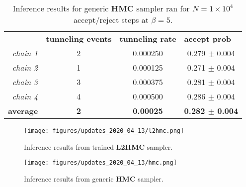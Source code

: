 %
\begin{table}[ht!]
  \centering
  \begin{tabular}{@{}rccc@{}}
  \multicolumn{1}{l}{} & \multicolumn{1}{l}{\textbf{tunneling events}} & \multicolumn{1}{l}{\textbf{tunneling rate}} & \multicolumn{1}{l}{\textbf{accept prob}} \\
  \cmidrule(l){1-4}
  \multicolumn{1}{r}{\textit{chain 1}} & 2 & 0.000250 & 0.279 \(\pm\) 0.004 \\
  \multicolumn{1}{r}{\textit{chain 2}} & 1 & 0.000125 & 0.271 \(\pm\) 0.004 \\
  \multicolumn{1}{r}{\textit{chain 3}} & 3 & 0.000375 & 0.281 \(\pm\) 0.004 \\
  \multicolumn{1}{r}{\textit{chain 4}} & 4 & 0.000500 & 0.286 \(\pm\) 0.004 \\
  \cmidrule(l){1-4}
  \multicolumn{1}{r}{\textbf{average}} & \textbf{2} & \textbf{0.00025} &
  \textbf{0.282 \(\pm\) 0.004}
  \end{tabular}
  \caption{Inference results for generic \textbf{HMC} sampler ran for \(N = 1\times
  10^{4}\) accept/reject steps at \(\beta = 5\).}%
  \label{tab:hmc_inference}
\end{table}
%
\clearpage
%
\begin{figure}[ht!]
  \centering
  \texttt{[image: figures/updates\_2020\_04\_13/l2hmc.png]}
  \caption{Inference results from trained \textbf{L2HMC} sampler.}%
  \label{fig:l2hmc_inference}
\end{figure}
%
\begin{figure}[ht!]
  \centering
  \texttt{[image: figures/updates\_2020\_04\_13/hmc.png]}
  \caption{Inference results from generic \textbf{HMC} sampler.}%
  \label{fig:hmc_inference}
\end{figure}
%
%
